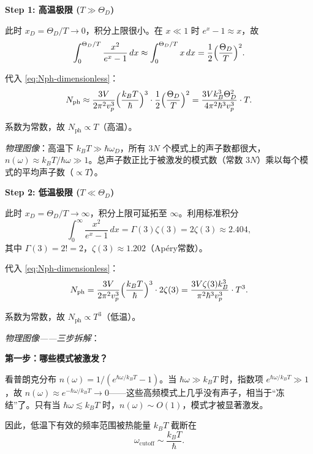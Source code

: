 \begin{derivationbox}[标准解题过程]
\textbf{Step 1: 高温极限 ($T\gg\Theta_D$)}

此时 $x_D=\Theta_D/T\to0$，积分上限很小。在 $x\ll1$ 时 $e^x-1\approx x$，故
\begin{equation}
\int_0^{\Theta_D/T}\frac{x^2}{e^x-1}\,dx \approx \int_0^{\Theta_D/T}x\,dx = \frac{1}{2}\Bigl(\frac{\Theta_D}{T}\Bigr)^2.
\end{equation}

代入 \eqref{eq:Nph-dimensionless}：
\begin{equation}
N_{\text{ph}} \approx \frac{3V}{2\pi^2v_p^3}\Bigl(\frac{k_BT}{\hbar}\Bigr)^3\cdot\frac{1}{2}\Bigl(\frac{\Theta_D}{T}\Bigr)^2
=\frac{3Vk_B^3\Theta_D^2}{4\pi^2\hbar^3v_p^3}\cdot T.
\end{equation}

系数为常数，故 \textbf{$N_{\text{ph}}\propto T$}（高温）。

\textit{物理图像}：高温下 $k_BT\gg\hbar\omega_D$，所有 $3N$ 个模式上的声子数都很大，$n(\omega)\approx k_BT/\hbar\omega\gg1$。总声子数正比于被激发的模式数（常数 $3N$）乘以每个模式的平均声子数（$\propto T$）。

\textbf{Step 2: 低温极限 ($T\ll\Theta_D$)}

此时 $x_D=\Theta_D/T\to\infty$，积分上限可延拓至 $\infty$。利用标准积分
\begin{equation}
\int_0^{\infty}\frac{x^2}{e^x-1}\,dx = \Gamma(3)\zeta(3)=2\zeta(3)\approx2.404,
\end{equation}
其中 $\Gamma(3)=2!=2$，$\zeta(3)\approx1.202$（Ap\'ery常数）。

代入 \eqref{eq:Nph-dimensionless}：
\begin{equation}
N_{\text{ph}} = \frac{3V}{2\pi^2v_p^3}\Bigl(\frac{k_BT}{\hbar}\Bigr)^3\cdot2\zeta(3)
=\frac{3V\zeta(3)k_B^3}{\pi^2\hbar^3v_p^3}\cdot T^3.
\end{equation}

系数为常数，故 \textbf{$N_{\text{ph}}\propto T^3$}（低温）。

\textit{物理图像——三步拆解}：

\textbf{第一步：哪些模式被激发？}

看普朗克分布 $n(\omega)=1/(e^{\hbar\omega/k_BT}-1)$。当 $\hbar\omega\gg k_BT$ 时，指数项 $e^{\hbar\omega/k_BT}\gg1$，故 $n(\omega)\approx e^{-\hbar\omega/k_BT}\to0$——这些高频模式上几乎没有声子，相当于``冻结''了。只有当 $\hbar\omega\lesssim k_BT$ 时，$n(\omega)\sim O(1)$，模式才被显著激发。

因此，低温下有效的频率范围被热能量 $k_BT$ 截断在
\begin{equation}
\omega_{\text{cutoff}}\sim\frac{k_BT}{\hbar}.
\end{equation}


\end{derivationbox}
